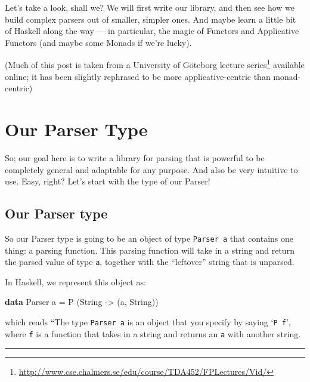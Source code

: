 \documentclass[]{article}
\newenvironment{Shaded}{}{}
\newcommand{\KeywordTok}[1]{\textcolor[rgb]{0.00,0.44,0.13}{\textbf{{#1}}}}
\newcommand{\DataTypeTok}[1]{\textcolor[rgb]{0.56,0.13,0.00}{{#1}}}
\newcommand{\OtherTok}[1]{\textcolor[rgb]{0.00,0.44,0.13}{{#1}}}
\newcommand{\FunctionTok}[1]{\textcolor[rgb]{0.02,0.16,0.49}{{#1}}}
\newcommand{\NormalTok}[1]{{#1}}
\renewcommand{\href}[2]{#2\footnote{\url{#1}}}
\begin{document}
Let's take a look, shall we? We will first write our library, and then see how
we build complex parsers out of smaller, simpler ones. And maybe learn a little
bit of Haskell along the way --- in particular, the magic of Functors and
Applicative Functors (and maybe some Monads if we're lucky).

(Much of this post is taken from a University of Göteborg
\href{http://www.cse.chalmers.se/edu/course/TDA452/FPLectures/Vid/}{lecture
series} available online; it has been slightly rephrased to be more
applicative-centric than monad-centric)

\section{Our Parser Type}\label{our-parser-type}

So; our goal here is to write a library for parsing that is powerful to be
completely general and adaptable for any purpose. And also be very intuitive to
use. Easy, right? Let's start with the type of our Parser!

\subsection{Our Parser type}\label{our-parser-type-1}

So our Parser type is going to be an object of type \texttt{Parser\ a} that
contains one thing: a parsing function. This parsing function will take in a
string and return the parsed value of type \texttt{a}, together with the
``leftover'' string that is unparsed.

In Haskell, we represent this object as:

\begin{Shaded}
\begin{Highlighting}[]
\KeywordTok{data} \DataTypeTok{Parser} \NormalTok{a }\FunctionTok{=} \DataTypeTok{P} \NormalTok{(}\DataTypeTok{String} \OtherTok{->} \NormalTok{(a, }\DataTypeTok{String}\NormalTok{))}
\end{Highlighting}
\end{Shaded}

which reads ``The type \texttt{Parser\ a} is an object that you specify by
saying `\texttt{P\ f}', where \texttt{f} is a function that takes in a string
and returns an \texttt{a} with another string.

\begin{center}\rule{0.5\linewidth}{\linethickness}\end{center}
\end{document}
